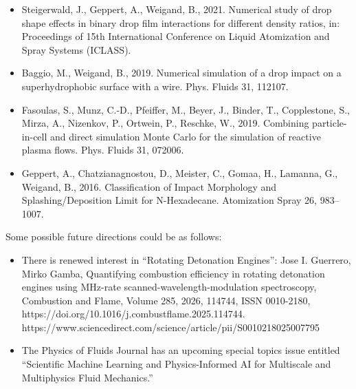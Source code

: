 \begin{itemize}
Air entrapment and bubble formation
during droplet impact onto a single cubic pillar. Sci Rep 11, 18018.
\item Steigerwald, J., Geppert, A., Weigand, B., 2021. 
Numerical study of drop shape effects in
binary drop film interactions for different density ratios, in: 
Proceedings of 15th International
Conference on Liquid Atomization and Spray Systems (ICLASS).
\item Baggio, M., Weigand, B., 2019. Numerical simulation of a 
drop impact on a superhydrophobic surface with a wire. Phys. Fluids 31, 112107.
\item Fasoulas, S., Munz, C.-D., Pfeiffer, M., Beyer, J., Binder, T., 
Copplestone, S., Mirza, A., Nizenkov, P., Ortwein, P., Reschke, W., 2019. 
Combining particle-in-cell and direct simulation Monte Carlo for 
the simulation of reactive plasma flows. Phys. Fluids 31, 072006.
\item Geppert, A., Chatzianagnostou, D., Meister, C., Gomaa, H., 
Lamanna, G., Weigand, B., 2016. Classification of Impact Morphology 
and Splashing/Deposition Limit for N-Hexadecane. Atomization 
Spray 26, 983–1007. 
\end{itemize}
\newpage
Some possible future directions could be as follows:
\begin{itemize}
\item There is renewed interest in ``Rotating Detonation Engines'':
Jose I. Guerrero, Mirko Gamba, Quantifying combustion efficiency in 
rotating detonation engines using MHz-rate scanned-wavelength-modulation 
spectroscopy, Combustion and Flame, 
Volume 285, 2026, 114744, ISSN 0010-2180, \\
https://doi.org/10.1016/j.combustflame.2025.114744. \\
https://www.sciencedirect.com/science/article/pii/S0010218025007795 
\item The Physics of Fluids Journal has an upcoming special topics
 issue entitled ``Scientific Machine Learning and Physics-Informed 
AI for Multiscale and Multiphysics Fluid Mechanics.''
\end{itemize}


